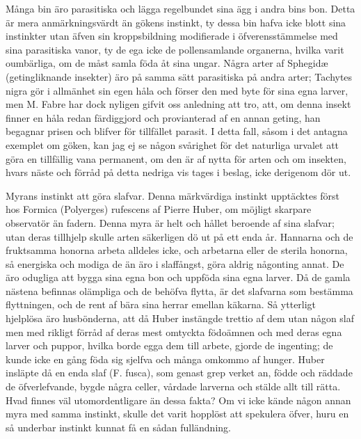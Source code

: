 Många bin äro parasitiska och lägga regelbundet sina ägg i andra bins bon. Detta är mera anmärkningsvärdt än gökens instinkt, ty dessa bin hafva icke blott sina instinkter utan äfven sin kroppsbildning modifierade i öfverensstämmelse med sina parasitiska vanor, ty de ega icke de pollensamlande organerna, hvilka varit oumbärliga, om de måst samla föda åt sina ungar. Några arter af Sphegidæ (getingliknande insekter) äro på samma sätt parasitiska på andra arter; Tachytes nigra gör i allmänhet sin egen håla och förser den med byte för sina egna larver, men M. Fabre har dock nyligen gifvit oss anledning att tro, att, om denna insekt finner en håla redan färdiggjord och provianterad af en annan geting, han begagnar prisen och blifver för tillfället parasit. I detta fall, såsom i det antagna exemplet om göken, kan jag ej se någon svårighet för det naturliga urvalet att göra en tillfällig vana permanent, om den är af nytta för arten och om insekten, hvars näste och förråd på detta nedriga vis tages i beslag, icke derigenom dör ut.

Myrans instinkt att göra slafvar. Denna märkvärdiga instinkt upptäcktes först hos Formica (Polyerges) rufescens af Pierre Huber, om möjligt skarpare observatör än fadern. Denna myra är helt och hållet beroende af sina slafvar; utan deras tillhjelp skulle arten säkerligen dö ut på ett enda år. Hannarna och de fruktsamma honorna arbeta alldeles icke, och arbetarna eller de sterila honorna, så energiska och modiga de än äro i slaffångst, göra aldrig någonting annat. De äro odugliga att bygga sina egna bon och uppföda sina egna larver. Då de gamla nästena befinnas olämpliga och de behöfva flytta, är det slafvarna som bestämma flyttningen, och de rent af bära sina herrar emellan käkarna. Så ytterligt hjelplösa äro husbönderna, att då Huber instängde trettio af dem utan någon slaf men med rikligt förråd af deras mest omtyckta födoämnen och med deras egna larver och puppor, hvilka borde egga dem till arbete, gjorde de ingenting; de kunde icke en gång föda sig sjelfva och många omkommo af hunger. Huber insläpte då en enda slaf (F. fusca), som genast grep verket an, födde och räddade de öfverlefvande, bygde några celler, vårdade larverna och stälde allt till rätta. Hvad finnes väl utomordentligare än dessa fakta? Om vi icke kände någon annan myra med samma instinkt, skulle det varit hopplöst att spekulera öfver, huru en så underbar instinkt kunnat få en sådan fulländning.

